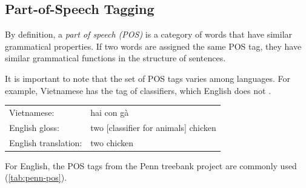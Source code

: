 \subsection{Part-of-Speech Tagging}
\label{the-ling-pos}

By definition, a \textit{part of speech (POS)} is a category of words that have similar grammatical properties.
If two words are assigned the same POS tag, they have similar grammatical functions in the structure of sentences.

It is important to note that the set of POS tags varies among languages. For example, Vietnamese has the tag of classifiers, which English does not \citep{le2010empirical}.

\bigskip

\begin{tabular}{l  l}

    Vietnamese: & hai con gà \\
    English gloss: & two [classifier for animals] chicken \\
    English translation: & two chicken \\
\end{tabular}

\bigskip

For English, the POS tags from the Penn treebank project \citep{Marcus93buildinga} are commonly used (\cref{tab:penn-pos}).

